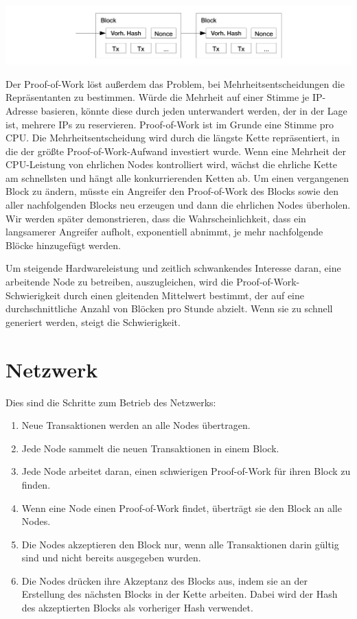 \documentclass[9pt]{article}
\begin{document}
	\begin{center}
		\includegraphics[width=\textwidth]{pics/proofofwork.png}	
	\end{center}
	
	Der Proof-of-Work löst außerdem das Problem, bei Mehrheitsentscheidungen die Repräsentanten zu bestimmen. Würde die Mehrheit auf einer Stimme je IP-Adresse basieren, könnte diese durch jeden unterwandert werden, der in der Lage ist, mehrere IPs zu reservieren. Proof-of-Work ist im Grunde eine Stimme pro CPU. Die Mehrheitsentscheidung wird durch die längste Kette repräsentiert, in die der größte Proof-of-Work-Aufwand investiert wurde. Wenn eine Mehrheit der CPU-Leistung von ehrlichen Nodes kontrolliert wird, wächst die ehrliche Kette am schnellsten und hängt alle konkurrierenden Ketten ab. Um einen vergangenen Block zu ändern, müsste ein Angreifer den Proof-of-Work des Blocks sowie den aller nachfolgenden Blocks neu erzeugen und dann die ehrlichen Nodes überholen. Wir werden später demonstrieren, dass die Wahrscheinlichkeit, dass ein langsamerer Angreifer aufholt, exponentiell abnimmt, je mehr nachfolgende Blöcke hinzugefügt werden.

    Um steigende Hardwareleistung und zeitlich schwankendes Interesse daran, eine arbeitende Node zu betreiben, auszugleichen, wird die Proof-of-Work-Schwierigkeit durch einen gleitenden Mittelwert bestimmt, der auf eine durchschnittliche Anzahl von Blöcken pro Stunde abzielt. Wenn sie zu schnell generiert werden, steigt die Schwierigkeit.
	
	\section{Netzwerk}
	
    Dies sind die Schritte zum Betrieb des Netzwerks:
	
	\begin{enumerate}[label={\arabic*)}, topsep=0pt, itemsep=-1ex, partopsep=1ex, parsep=1ex]
		\item Neue Transaktionen werden an alle Nodes übertragen.
		\item Jede Node sammelt die neuen Transaktionen in einem Block.
		\item Jede Node arbeitet daran, einen schwierigen Proof-of-Work für ihren Block zu finden.
		\item Wenn eine Node einen Proof-of-Work findet, überträgt sie den Block an alle Nodes.
		\item Die Nodes akzeptieren den Block nur, wenn alle Transaktionen darin gültig sind und nicht bereits ausgegeben wurden.
		\item Die Nodes drücken ihre Akzeptanz des Blocks aus, indem sie an der Erstellung des nächsten Blocks in der Kette arbeiten. Dabei wird der Hash des akzeptierten Blocks als vorheriger Hash verwendet.
	\end{enumerate}
	
\end{document}
